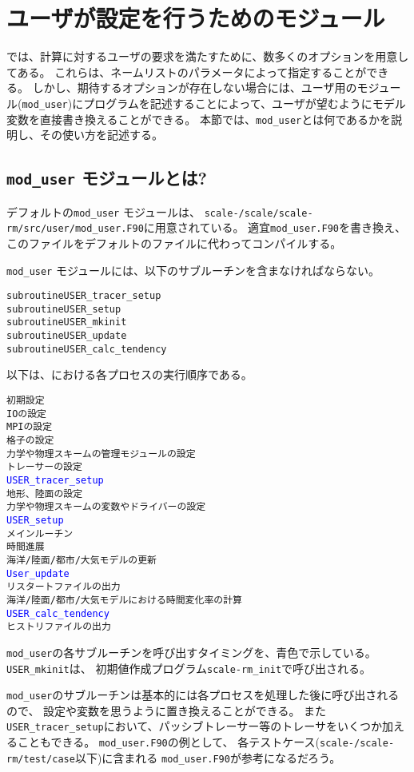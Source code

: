 \section{ユーザが設定を行うためのモジュール} \label{sec:mod_user}

\scalerm では、計算に対するユーザの要求を満たすために、数多くのオプションを用意してある。
これらは、ネームリストのパラメータによって指定することができる。
しかし、期待するオプションが存在しない場合には、ユーザ用のモジュール(\verb|mod_user|)にプログラムを記述することによって、ユーザが望むようにモデル変数を直接書き換えることができる。
本節では、\verb|mod_user|とは何であるかを説明し、その使い方を記述する。


\subsection{\texttt{mod\_user} モジュールとは?}

デフォルトの\verb|mod_user| モジュールは、 \texttt{scale-{\version}/scale/scale-rm/src/user/mod\_user.F90}に用意されている。
適宜\verb|mod_user.F90|を書き換え、このファイルをデフォルトのファイルに代わってコンパイルする。

\verb|mod_user| モジュールには、以下のサブルーチンを含まなければならない。
\begin{alltt}
  subroutine USER_tracer_setup
  subroutine USER_setup
  subroutine USER_mkinit
  subroutine USER_update
  subroutine USER_calc_tendency
\end{alltt}

\noindent 以下は、\scalerm における各プロセスの実行順序である。
\begin{alltt}
初期設定
  IOの設定
  MPIの設定
  格子の設定
  力学や物理スキームの管理モジュールの設定
  トレーサーの設定
  \textcolor{blue}{USER_tracer_setup}
  地形、陸面の設定
  力学や物理スキームの変数やドライバーの設定
  \textcolor{blue}{USER_setup}
メインルーチン
  時間進展
  海洋/陸面/都市/大気モデルの更新
  \textcolor{blue}{User_update}
  リスタートファイルの出力
  海洋/陸面/都市/大気モデルにおける時間変化率の計算
  \textcolor{blue}{USER_calc_tendency}
  ヒストリファイルの出力
\end{alltt}
\verb|mod_user|の各サブルーチンを呼び出すタイミングを、青色で示している。
\verb|USER_mkinit|は、 初期値作成プログラム\verb|scale-rm_init|で呼び出される。


\verb|mod_user|のサブルーチンは基本的には各プロセスを処理した後に呼び出されるので、
設定や変数を思うように置き換えることができる。
また\verb|USER_tracer_setup|において、パッシブトレーサー等のトレーサをいくつか加えることもできる。
\verb|mod_user.F90|の例として、
各テストケース(\texttt{scale-{\version}/scale-rm/test/case}以下)に含まれる
\verb|mod_user.F90|が参考になるだろう。



